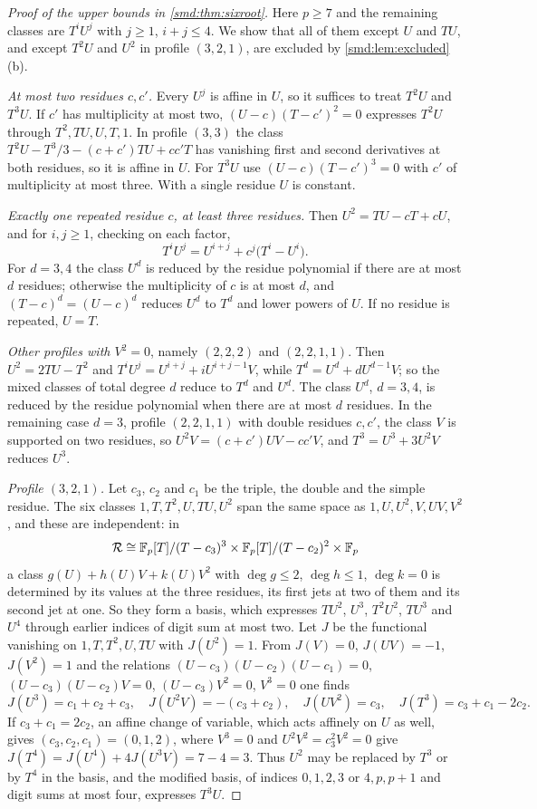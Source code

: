 \begin{proof}[Proof of the upper bounds in \cref{smd:thm:sixroot}]
Here $p\ge7$ and the remaining classes are $T^iU^j$ with $j\ge1$, $i+j\le4$. We show that
all of them except $U$ and $TU$, and except $T^2U$ and $U^2$ in profile $(3,2,1)$, are
excluded by \cref{smd:lem:excluded}(b).

\emph{At most two residues $c,c'$.} Every $U^j$ is affine in $U$, so it suffices to treat
$T^2U$ and $T^3U$. If $c'$ has multiplicity at most two, $(U-c)(T-c')^2=0$ expresses
$T^2U$ through $T^2,TU,U,T,1$. In profile $(3,3)$ the class
$T^2U-T^3/3-(c+c')TU+cc'T$ has vanishing first and second derivatives at both residues, so it
is affine in $U$. For $T^3U$ use $(U-c)(T-c')^3=0$ with $c'$ of multiplicity at most three.
With a single residue $U$ is constant.

\emph{Exactly one repeated residue $c$, at least three residues.} Then $U^2=TU-cT+cU$, and
for $i,j\ge1$, checking on each factor,
\[
 T^iU^j=U^{i+j}+c^j\bigl(T^i-U^i\bigr).
\]
For $d=3,4$ the class $U^d$ is reduced by the residue polynomial if there are at most $d$
residues; otherwise the multiplicity of $c$ is at most $d$, and $(T-c)^d=(U-c)^d$ reduces
$U^d$ to $T^d$ and lower powers of $U$. If no residue is repeated, $U=T$.

\emph{Other profiles with $V^2=0$}, namely $(2,2,2)$ and $(2,2,1,1)$. Then $U^2=2TU-T^2$ and
$T^iU^j=U^{i+j}+iU^{i+j-1}V$, while $T^d=U^d+dU^{d-1}V$; so the mixed classes of total degree
$d$ reduce to $T^d$ and $U^d$. The class $U^d$, $d=3,4$, is reduced by the residue polynomial
when there are at most $d$ residues. In the remaining case $d=3$, profile $(2,2,1,1)$ with
double residues $c,c'$, the class $V$ is supported on two residues, so
$U^2V=(c+c')UV-cc'V$, and $T^3=U^3+3U^2V$ reduces $U^3$.

\emph{Profile $(3,2,1)$.} Let $c_3$, $c_2$ and $c_1$ be the triple, the double and the
simple residue. The six classes $1,T,T^2,U,TU,U^2$ span the same space as $1,U,U^2,V,UV,V^2$, and these are
independent: in
\[
 \mathcal R\cong\mathbb{F}_p[T]/(T-c_3)^3\times\mathbb{F}_p[T]/(T-c_2)^2\times\mathbb{F}_p
\]
a class $g(U)+h(U)V+k(U)V^2$ with $\deg g\le2$, $\deg h\le1$, $\deg k=0$ is determined by its values
at the three residues, its first jets at two of them and its second jet at one. So they form a
basis, which expresses $TU^2$, $U^3$, $T^2U^2$, $TU^3$ and $U^4$ through earlier indices of
digit sum at most two. Let $J$ be the functional vanishing on $1,T,T^2,U,TU$ with
$J(U^2)=1$. From $J(V)=0$, $J(UV)=-1$, $J(V^2)=1$ and the relations
$(U-c_3)(U-c_2)(U-c_1)=0$, $(U-c_3)(U-c_2)V=0$, $(U-c_3)V^2=0$, $V^3=0$ one finds
\[
 J(U^3)=c_1+c_2+c_3,\quad J(U^2V)=-(c_3+c_2),\quad J(UV^2)=c_3,\quad
 J(T^3)=c_3+c_1-2c_2 .
\]
If $c_3+c_1=2c_2$, an affine change of variable, which acts affinely on $U$ as well, gives
$(c_3,c_2,c_1)=(0,1,2)$, where $V^3=0$ and $U^2V^2=c_3^2V^2=0$ give
$J(T^4)=J(U^4)+4J(U^3V)=7-4=3$. Thus $U^2$ may be replaced by
$T^3$ or by $T^4$ in the basis, and the modified basis, of indices $0,1,2,3\text{ or }4,p,p+1$
and digit sums at most four, expresses $T^3U$.


\end{proof}
